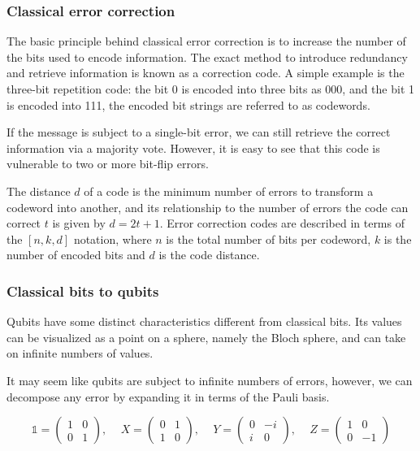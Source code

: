 \subsubsection{Classical error correction}

The basic principle behind classical error correction is to increase the number of the bits used to encode information. The exact method to introduce redundancy and retrieve information is known as a correction code. A simple example is the three-bit repetition code: the bit 0 is encoded into three bits as 000, and the bit 1 is encoded into 111, the encoded bit strings are referred to as codewords.

If the message is subject to a single-bit error, we can still retrieve the correct information via a majority vote. However, it is easy to see that this code is vulnerable to two or more bit-flip errors.

The distance $d$ of a code is the minimum number of errors to transform a codeword into another, and its relationship to the number of errors the code can correct $t$ is given by $d=2t+1$. Error correction codes are described in terms of the $[n,k,d]$ notation, where $n$ is the total number of bits per codeword, $k$ is the number of encoded bits and $d$ is the code distance.

\subsubsection{Classical bits to qubits}

Qubits have some distinct characteristics different from classical bits. Its values can be visualized as a point on a sphere, namely the Bloch sphere, and can take on infinite numbers of values.

It may seem like qubits are subject to infinite numbers of errors, however, we can decompose any error by expanding it in terms of the Pauli basis.

\[
    \mathbb{1} =
    \begin{pmatrix}
        1 & 0 \\
        0 & 1
    \end{pmatrix}
    \text{, }
    \quad
    X =
    \begin{pmatrix}
        0 & 1 \\
        1 & 0
    \end{pmatrix}
    \text{, }
    \quad
    Y =
    \begin{pmatrix}
        0 & -i \\
        i & 0
    \end{pmatrix}
    \text{, }
    \quad
    Z =
    \begin{pmatrix}
        1 & 0  \\
        0 & -1
    \end{pmatrix}
\]

